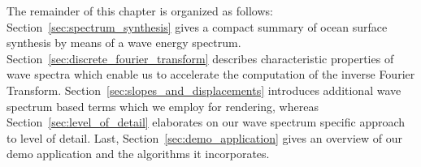 

%



%
%
%

The remainder of this chapter is organized as follows:
Section~\ref{sec:spectrum_synthesis} gives a compact summary of ocean surface
synthesis by means of a wave energy spectrum.
Section~\ref{sec:discrete_fourier_transform} describes characteristic properties of
wave spectra which enable us to accelerate the computation of the inverse Fourier Transform.
Section~\ref{sec:slopes_and_displacements} introduces additional wave spectrum
based terms which we employ for rendering, whereas
Section~\ref{sec:level_of_detail} elaborates on our wave spectrum specific
approach to level of detail. Last, Section~\ref{sec:demo_application} gives an
overview of our demo application and the algorithms it incorporates.

